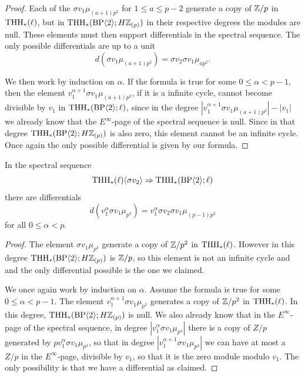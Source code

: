 \begin{proof}
  Each of the $\sigma v_1 \mu_{(a+1)p^2}$ for $1 \leq a \leq p -2$ generate a copy of $\mathbb{Z}/p$ in $\operatorname{THH}_*(\ell)$, but in $\operatorname{THH}_*(\mathrm{BP} \langle 2 \rangle; H \mathbb{Z}_{(p)})$ in their respective degrees the modules are null. These elements must then support differentials in the spectral sequence. The only possible differentials are up to a unit
  \begin{equation}
    d(\sigma v_1 \mu_{(a + 1)p^2}) = \sigma v_2 \sigma v_1 \mu_{a p^2}.
  \end{equation}

  We then work by induction on $\alpha$. If the formula is true for some $0 \leq \alpha < p - 1$, then the element $v_1^{\alpha + 1} \sigma v_1 \mu_{(a+1)p^2}$, if it is a infinite cycle, cannot become divisible by $v_1$ in $\operatorname{THH}_*(\mathrm{BP} \langle 2 \rangle; \ell)$, since in the degree $|v_1^{\alpha + 1} \sigma v_1 \mu_{(a+1)p^2}| - |v_1|$ we already know that the $E^\infty$-page of the spectral sequence is null. Since in that degree $\operatorname{THH}_*(\mathrm{BP} \langle 2 \rangle; H \mathbb{Z}_{(p)})$ is also zero, this element cannot be an infinite cycle. Once again the only possible differential is given by our formula.
\end{proof}

\begin{proposition}\label{proposition:secondlowdegreecomputation}
  In the spectral sequence
  \begin{equation}
    \operatorname{THH}_*(\ell)\langle \sigma v_2 \rangle \Rightarrow \operatorname{THH}_* (\mathrm{BP} \langle 2 \rangle ; \ell)
  \end{equation}
  there are differentials
  \begin{equation}
    d(v_1^\alpha \sigma v_1 \mu_{p^3}) = v_1^\alpha \sigma v_2 \sigma v_1 \mu_{(p-1)p^2}
  \end{equation}
  for all $0 \leq \alpha < p$.  
\end{proposition}

\begin{proof}
  The element $\sigma v_1 \mu_{p^3}$ generate a copy of $\mathbb{Z} /p^2$ in $\operatorname{THH}_*(\ell)$. However in this degree $\operatorname{THH}_*(\mathrm{BP} \langle 2 \rangle; H \mathbb{Z}_{(p)})$ is $\mathbb{Z}/p$, so this element is not an infinite cycle and and the only differential possible is the one we claimed.

  We once again work by induction on $\alpha$. Assume the formula is true for some $0 \leq \alpha < p - 1$. The element $v_1^{\alpha +1 } \sigma v_1 \mu_{p^3}$ generates a copy of $\mathbb{Z}/p^2$ in $\operatorname{THH}_*(\ell)$. In this degree, $\operatorname{THH}_*(\mathrm{BP} \langle 2 \rangle; H \mathbb{Z}_{(p)})$ is null. We also already know that in the $E^\infty$-page of the spectral sequence, in degree $|v_1^\alpha \sigma v_1 \mu_{p^3}|$ there is a copy of $Z/p$ generated by $p v_1^\alpha \sigma v_1 \mu_{p^3}$, so that in degree $|v_1^{\alpha+1} \sigma v_1 \mu_{p^3}|$ we can have at most a $Z/p$ in the $E^\infty$-page, divisible by $v_1$, so that it is the zero module modulo $v_1$. The only possibility is that we have a differential as claimed.
\end{proof}

